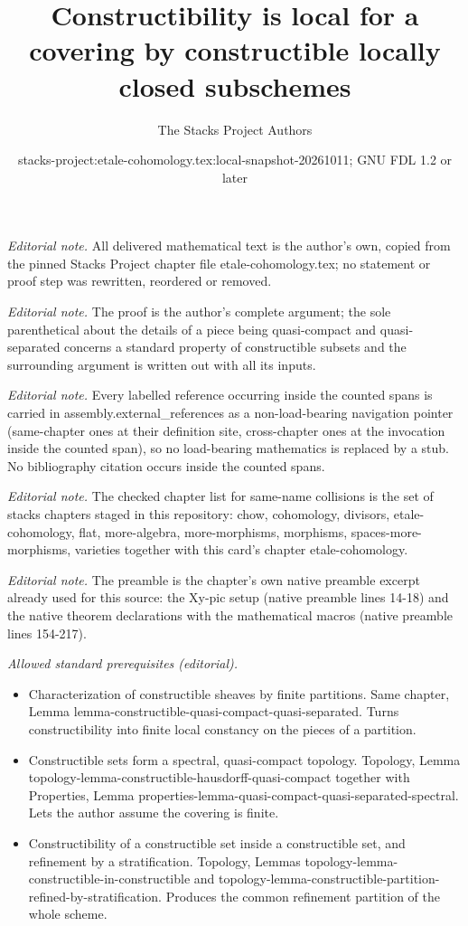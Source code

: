 \documentclass[10pt,a4paper]{amsart}
\title{Constructibility is local for a covering by constructible locally closed subschemes}
\author{The Stacks Project Authors}
\date{stacks-project:etale-cohomology.tex:local-snapshot-20261011; GNU FDL 1.2 or later}
\theoremstyle{plain}
\theoremstyle{definition}
\theoremstyle{remark}
\numberwithin{equation}{subsection}
\begin{document}
\maketitle
\noindent\textit{Editorial note.} All delivered mathematical text is the author's own, copied from the pinned Stacks Project chapter file etale-cohomology.tex; no statement or proof step was rewritten, reordered or removed.\par\medskip
\noindent\textit{Editorial note.} The proof is the author's complete argument; the sole parenthetical about the details of a piece being quasi-compact and quasi-separated concerns a standard property of constructible subsets and the surrounding argument is written out with all its inputs.\par\medskip
\noindent\textit{Editorial note.} Every labelled reference occurring inside the counted spans is carried in assembly.external\_references as a non-load-bearing navigation pointer (same-chapter ones at their definition site, cross-chapter ones at the invocation inside the counted span), so no load-bearing mathematics is replaced by a stub. No bibliography citation occurs inside the counted spans.\par\medskip
\noindent\textit{Editorial note.} The checked chapter list for same-name collisions is the set of stacks chapters staged in this repository: chow, cohomology, divisors, etale-cohomology, flat, more-algebra, more-morphisms, morphisms, spaces-more-morphisms, varieties together with this card's chapter etale-cohomology.\par\medskip
\noindent\textit{Editorial note.} The preamble is the chapter's own native preamble excerpt already used for this source: the Xy-pic setup (native preamble lines 14-18) and the native theorem declarations with the mathematical macros (native preamble lines 154-217).\par\medskip
\noindent\textit{Allowed standard prerequisites (editorial).}\begin{itemize}
\item Characterization of constructible sheaves by finite partitions. Same chapter, Lemma lemma-constructible-quasi-compact-quasi-separated. Turns constructibility into finite local constancy on the pieces of a partition.
\item Constructible sets form a spectral, quasi-compact topology. Topology, Lemma topology-lemma-constructible-hausdorff-quasi-compact together with Properties, Lemma properties-lemma-quasi-compact-quasi-separated-spectral. Lets the author assume the covering is finite.
\item Constructibility of a constructible set inside a constructible set, and refinement by a stratification. Topology, Lemmas topology-lemma-constructible-in-constructible and topology-lemma-constructible-partition-refined-by-stratification. Produces the common refinement partition of the whole scheme.
\end{itemize}\medskip
\end{document}

